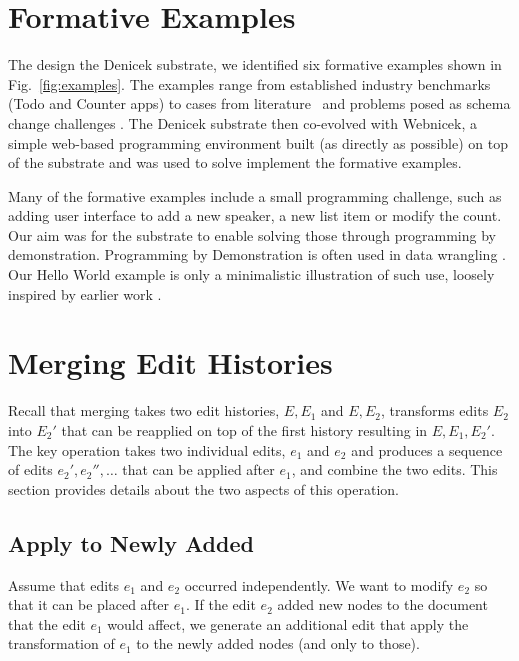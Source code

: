 \documentclass[sigconf]{acmart}
\begin{document}
\section{Formative Examples}
\label{app:examples}

The design the Denicek substrate, we identified six formative examples shown in
Fig.~\ref{fig:examples}. The examples range from established industry benchmarks
(Todo and Counter apps) to cases from literature~\cite{edwards-2022-copypaste} and
problems posed as schema change challenges \cite{edwards-2025-schema}.
The Denicek substrate then co-evolved with Webnicek, a simple web-based programming environment
built (as directly as possible) on top of the substrate and was used to solve implement the
formative examples.

Many of the formative examples include a small programming challenge, such as adding
user interface to add a new speaker, a new list item or modify the count. Our aim was for
the substrate to enable solving  those through programming by demonstration.
Programming by Demonstration is often used in data wrangling
\cite{gulwani-2012-spreadsheets,drossos-2020-wrex,gulwani-2014-flash}. Our Hello World example
is only a minimalistic illustration of such use, loosely inspired by earlier work \cite{miller-2001-simult}.

\section{Merging Edit Histories}
Recall that merging takes two edit histories, $E, E_1$ and $E, E_2$,
transforms edits $E_2$ into $E_2'$ that can be reapplied on top of the first history
resulting in $E, E_1, E_2'$. The key operation takes two individual edits, $e_1$ and $e_2$
and produces a sequence of edits $e_2', e_2'', \ldots$ that can be applied after $e_1$,
and combine the two edits. This section provides details about the two aspects of this operation.

\subsection{Apply to Newly Added}
\label{app:merge-apply-to-added}

Assume that edits $e_1$ and $e_2$ occurred independently. We want to modify $e_2$ so that
it can be placed after $e_1$. If the edit $e_2$ added new nodes to the document that the
edit $e_1$ would affect, we generate an additional edit that apply the transformation of $e_1$
to the newly added nodes (and only to those).
\end{document}
